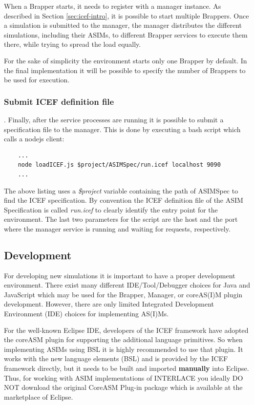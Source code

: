 When a Brapper starts, it needs to register with a manager instance. As described in Section \ref{sec:icef-intro}, it is possible to start multiple Brappers. Once a simulation is submitted to the manager, the manager distributes the different simulations, including their ASIMs, to different Brapper services to execute them there, while trying to spread the load equally.

For the sake of simplicity the environment starts only one Brapper by default. In the final implementation it will be possible to specify the number of Brappers to be used for execution.

\subsubsection{Submit ICEF definition file}. Finally, after the service processes are running it is possible to submit a specification file to the manager. This is done by executing a bash script which calls a  nodejs client:

\begin{lstlisting}
	...
	node loadICEF.js $project/ASIMSpec/run.icef localhost 9090
	...
\end{lstlisting}

The above listing uses a \textit{\$project} variable containing the path of ASIMSpec to find the ICEF specification. By convention the ICEF definition file of the ASIM Specification is called \textit{run.icef} to clearly identify the entry point for the environment. The last two parameters for the script are the host and the port where the manager service is running and waiting for requests, respectively.

\subsection{Development}
\label{sec:development}
For developing new simulations it is important to have a proper development environment. There exist many different IDE/Tool/Debugger choices for Java and JavaScript which may be used for the Brapper, Manager, or coreAS(I)M plugin development. However, there are only limited Integrated Development Environment (IDE) choices for implementing AS(I)Ms.

For the well-known Eclipse IDE, developers of the ICEF framework have adopted the coreASM plugin for supporting the additional language primitives. So when implementing ASIMs using BSL it is highly recommended to use that plugin. It works with the new language elements (BSL) and is provided by the ICEF framework directly, but it needs to be built and imported \textbf{manually} into Eclipse. Thus, for working with ASIM implementations of INTERLACE you ideally DO NOT download the original CoreASM Plug-in package which is available at the marketplace of Eclipse.

